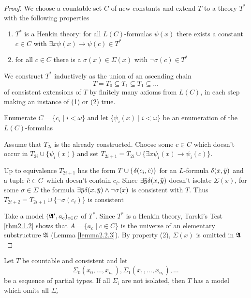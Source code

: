 \documentclass[11pt]{article}
\begin{document}
\begin{proof}
We choose a countable set \(C\) of new constants and extend \(T\) to a theory
\(T^*\) with the following properties
\begin{enumerate}
\item \(T^*\) is a Henkin theory: for all \(L(C)\)-formulas \(\psi(x)\) there
exists a constant \(c\in C\) with \(\exists x\psi(x)\to\psi(c)\in T^*\)
\item for all \(c\in C\) there is a \(\sigma(x)\in\Sigma(x)\) with \(\neg\sigma(c)\in T^*\)
\end{enumerate}


We construct \(T^*\) inductively as the union of an ascending chain
\begin{equation*}
T=T_0\subseteq T_1\subseteq T_1\subseteq\dots
\end{equation*}
of consistent extensions of \(T\) by finitely many axioms from \(L(C)\), in
each step making an instance of (1) or (2) true.

Enumerate \(C=\{c_i\mid i<\omega\}\) and let \(\{\psi_i(x)\mid i<\omega\}\)
be an enumeration of the \(L(C)\)-formulas

Assume that \(T_{2i}\) is the already constructed. Choose some \(c\in C\)
which doesn't occur in \(T_{2i}\cup\{\psi_i(x)\}\) and set
\(T_{2i+1}=T_{2i}\cup\{\exists x\psi_i(x)\to\psi_i(c)\}\).

Up to equivalence \(T_{2i+1}\) has the form \(T\cup\{\delta(c_i,\bbar{c})\}\) for
an \(L\)-formula \(\delta(x,\bbar{y})\) and a tuple \(\bbar{c}\in C\) which
doesn't contain \(c_i\). Since \(\exists\bbar{y}\delta(x,\bbar{y})\) doesn't
isolate \(\Sigma(x)\), for some \(\sigma\in\Sigma\) the formula
\(\exists\bbar{y}\delta(x,\bbar{y})\wedge\neg\sigma(x)\) is consistent with \(T\).
Thus \(T_{2i+2}=T_{2i+1}\cup\{\neg\sigma(c_i)\}\) is consistent

Take a model \((\mathfrak{A}',a_c)_{c\in C}\) of \(T^*\). Since \(T^*\) is a Henkin
theory, Tarski's Test \ref{thm2.1.2} shows that \(A=\{a_c\mid c\in C\}\) is the
universe of an elementary substructure \(\mathfrak{A}\) (Lemma \ref{lemma2.2.3}). By
property (2), \(\Sigma(x)\) is omitted in \(\mathfrak{A}\)
\end{proof}

\begin{corollary}[]
\label{cor4.1.3}
\label{ex4.1.1}
Let \(T\) be countable and consistent and let
\begin{equation*}
\Sigma_0(x_0,\dots,x_{n_0}),\Sigma_1(x_1,\dots,x_{n_1}),\dots
\end{equation*}
be a sequence of partial types. If all \(\Sigma_i\) are not isolated, then
\(T\) has a model which omits all \(\Sigma_i\)
\end{corollary}
\end{document}

